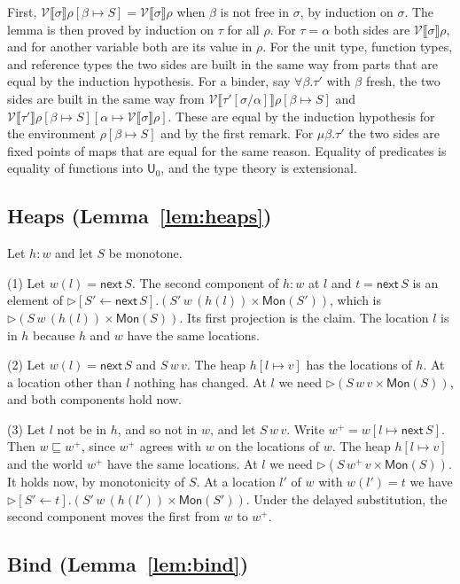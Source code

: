 \documentclass[acmsmall,nonacm,screen]{acmart}
\newcommand{\later}{{\triangleright}}
\newcommand{\nxt}{\mathsf{next}}
\newcommand{\Uv}{\mathsf{U}}
\newcommand{\sem}[1]{\llbracket #1 \rrbracket}
\newcommand{\dsub}[2]{[#1 \leftarrow #2]}
\newcommand{\Mon}{\mathsf{Mon}}
\newcommand{\Vr}{\mathcal{V}}
\newcommand{\ext}{\sqsubseteq}
\begin{document}
First, $\Vr\sem{\sigma}\rho[\beta \mapsto S] = \Vr\sem{\sigma}\rho$ when $\beta$ is not free
in $\sigma$, by induction on $\sigma$. The lemma is then proved by induction on $\tau$ for
all $\rho$. For $\tau = \alpha$ both sides are $\Vr\sem{\sigma}\rho$, and for another
variable both are its value in $\rho$. For the unit type, function types, and reference
types the two sides are built in the same way from parts that are equal by the induction
hypothesis. For a binder, say $\forall\beta.\tau'$ with $\beta$ fresh, the two sides are
built in the same way from $\Vr\sem{\tau'[\sigma/\alpha]}\rho[\beta \mapsto S]$ and
$\Vr\sem{\tau'}\rho[\beta \mapsto S][\alpha \mapsto \Vr\sem{\sigma}\rho]$. These are equal by
the induction hypothesis for the environment $\rho[\beta \mapsto S]$ and by the first
remark. For $\mu\beta.\tau'$ the two sides are fixed points of maps that are equal for the
same reason. Equality of predicates is equality of functions into $\Uv_0$, and the type
theory is extensional.

\subsection{Heaps (Lemma~\ref{lem:heaps})}

Let $h : w$ and let $S$ be monotone.

(1) Let $w(l) = \nxt\,S$. The second component of $h : w$ at $l$ and $t = \nxt\,S$ is an
element of $\later\dsub{S'}{\nxt\,S}.(S'\,w\,(h(l)) \times \Mon(S'))$, which is
$\later(S\,w\,(h(l)) \times \Mon(S))$. Its first projection is the claim. The location $l$
is in $h$ because $h$ and $w$ have the same locations.

(2) Let $w(l) = \nxt\,S$ and $S\,w\,v$. The heap $h[l \mapsto v]$ has the locations of $h$.
At a location other than $l$ nothing has changed. At $l$ we need
$\later(S\,w\,v \times \Mon(S))$, and both components hold now.

(3) Let $l$ not be in $h$, and so not in $w$, and let $S\,w\,v$. Write
$w^+ = w[l \mapsto \nxt\,S]$. Then $w \ext w^+$, since $w^+$ agrees with $w$ on the
locations of $w$. The heap $h[l \mapsto v]$ and the world $w^+$ have the same locations. At
$l$ we need $\later(S\,w^+\,v \times \Mon(S))$. It holds now, by monotonicity of $S$. At a
location $l'$ of $w$ with $w(l') = t$ we have
$\later\dsub{S'}{t}.(S'\,w\,(h(l')) \times \Mon(S'))$. Under the delayed substitution, the
second component moves the first from $w$ to $w^+$.

\subsection{Bind (Lemma~\ref{lem:bind})}
\end{document}

